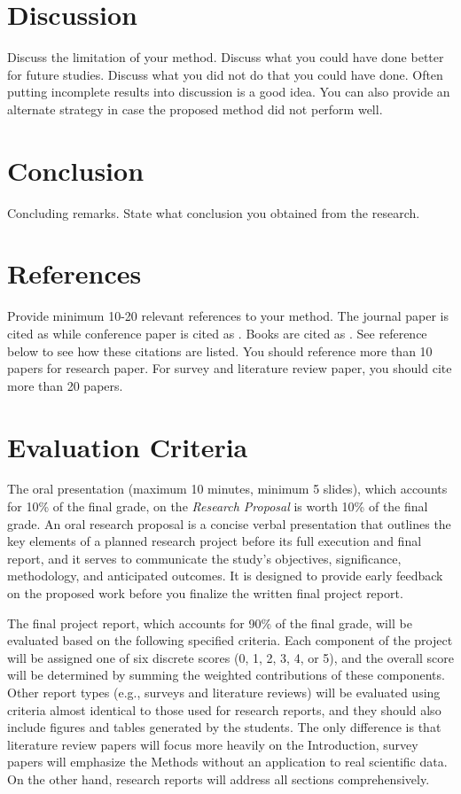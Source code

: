 \documentclass[12pt,portrait]{article}
\begin{document}
\section{Discussion}
Discuss the limitation of your method. Discuss what you could have done better for future studies. Discuss what you did not do that you could have done. Often putting incomplete results into discussion is a good idea. You can also provide   an alternate strategy in case the proposed method did not perform well.


\section{Conclusion}
Concluding remarks. State what conclusion you obtained from the research. 

\section{References}
Provide minimum 10-20 relevant references to your method. The journal paper is cited as \citet{chung.2001.NI} while conference paper is cited as \citet{chung.2003.CVPR}. Books are cited as \citet{chung.2012.CNA}. See reference below to see how these citations are listed. You should reference more than 10 papers for research paper. For survey and literature review paper, you should cite more than 20 papers. 







\newpage 
\section{Evaluation Criteria}


The oral presentation (maximum 10 minutes, minimum 5 slides), which accounts for 10\% of the final grade,  on the {\it Research Proposal} is worth 10\% of the final grade. An oral research proposal is a concise verbal presentation that outlines the key elements of a planned research project before its full execution and final report, and it serves to communicate the study’s objectives, significance, methodology, and anticipated outcomes. It is designed to provide early feedback on the proposed work before you finalize the written final project report. 

The final project report, which accounts for 90\% of the final grade, will be evaluated based on the following specified criteria. Each component of the project will be assigned one of six discrete scores (0, 1, 2, 3, 4, or 5), and the overall score will be determined by summing the weighted contributions of these components. 
Other report types (e.g., surveys and literature reviews) will be evaluated using criteria almost identical to those used for research reports, and they should also include figures and tables generated by the students. The only difference is that literature review papers will focus more heavily on the Introduction, survey papers will emphasize the Methods without an application to real scientific data. On the other hand, research reports will address all sections comprehensively.
\end{document}
